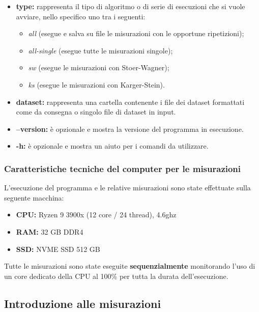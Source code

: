 \begin{itemize}
    \item \textbf{type:} rappresenta il tipo di algoritmo o di serie di esecuzioni che si vuole avviare, nello specifico uno tra i seguenti: 
    \begin{itemize}
        \item \textit{all} (esegue e salva su file le misurazioni con le opportune ripetizioni);
        \item \textit{all-single} (esegue tutte le misurazioni singole);
        \item \textit{sw} (esegue le misurazioni con Stoer-Wagner);
        \item \textit{ks} (esegue le misurazioni con Karger-Stein).   
    \end{itemize} 
    \item \textbf{dataset:} rappresenta una cartella contenente i file dei dataset formattati come da consegna o singolo file di dataset in input. 
    \item \textbf{--version:} è opzionale e mostra la versione del programma in esecuzione. 
    \item \textbf{-h:} è opzionale e mostra un aiuto per i comandi da utilizzare. 
\end{itemize}

\subsubsection{Caratteristiche tecniche del computer per le misurazioni} 

L'esecuzione del programma e le relative misurazioni sono state effettuate sulla seguente macchina:
\begin{itemize}
    \item \textbf{CPU:} Ryzen 9 3900x (12 core / 24 thread), 4.6ghz
    \item \textbf{RAM:} 32 GB DDR4 
    \item \textbf{SSD:} NVME SSD 512 GB
\end{itemize}

\noindent Tutte le misurazioni sono state eseguite \textbf{sequenzialmente} monitorando l'uso di un core dedicato della CPU al 100\% per tutta la durata dell'esecuzione.


\subsection{Introduzione alle misurazioni} 

